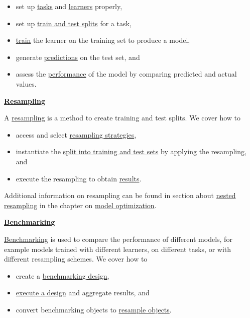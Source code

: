 \documentclass[12pt,]{scrbook}
\providecommand{\tightlist}{%
  \setlength{\itemsep}{0pt}\setlength{\parskip}{0pt}}
\begin{document}
\begin{itemize}
\tightlist
\item
  set up \protect\hyperlink{train-predict-objects}{tasks} and \protect\hyperlink{train-predict-objects}{learners} properly,
\item
  set up \protect\hyperlink{split-data}{train and test splits} for a task,
\item
  \protect\hyperlink{training}{train} the learner on the training set to produce a model,
\item
  generate \protect\hyperlink{predicting}{predictions} on the test set, and
\item
  assess the \protect\hyperlink{measure}{performance} of the model by comparing predicted and actual values.
\end{itemize}

\protect\hyperlink{resampling}{\textbf{Resampling}}

A \protect\hyperlink{resampling}{resampling} is a method to create training and test splits.
We cover how to

\begin{itemize}
\tightlist
\item
  access and select \protect\hyperlink{resamp-settings}{resampling strategies},
\item
  instantiate the \protect\hyperlink{resamp-inst}{split into training and test sets} by applying the resampling, and
\item
  execute the resampling to obtain \protect\hyperlink{resamp-exec}{results}.
\end{itemize}

Additional information on resampling can be found in section about \protect\hyperlink{nested-resampling}{nested resampling} in the chapter on \protect\hyperlink{model-optim}{model optimization}.

\protect\hyperlink{benchmarking}{\textbf{Benchmarking}}

\protect\hyperlink{benchmarking}{Benchmarking} is used to compare the performance of different models, for example models trained with different learners, on different tasks, or with different resampling schemes.
We cover how to

\begin{itemize}
\tightlist
\item
  create a \protect\hyperlink{bm-design}{benchmarking design},
\item
  \protect\hyperlink{bm-exec}{execute a design} and aggregate results, and
\item
  convert benchmarking objects to \protect\hyperlink{bm-resamp}{resample objects}.
\end{itemize}
\end{document}
